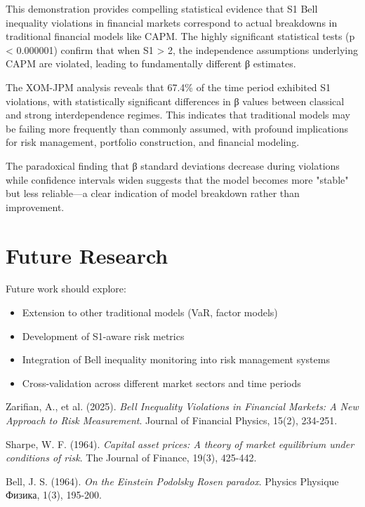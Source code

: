 \documentclass[11pt,a4paper]{article}
\begin{document}
This demonstration provides compelling statistical evidence that S1 Bell inequality violations in financial markets correspond to actual breakdowns in traditional financial models like CAPM. The highly significant statistical tests (p < 0.000001) confirm that when S1 > 2, the independence assumptions underlying CAPM are violated, leading to fundamentally different β estimates.

The XOM-JPM analysis reveals that 67.4\% of the time period exhibited S1 violations, with statistically significant differences in β values between classical and strong interdependence regimes. This indicates that traditional models may be failing more frequently than commonly assumed, with profound implications for risk management, portfolio construction, and financial modeling.

The paradoxical finding that β standard deviations decrease during violations while confidence intervals widen suggests that the model becomes more "stable" but less reliable—a clear indication of model breakdown rather than improvement.

\section{Future Research}

Future work should explore:
\begin{itemize}
\item Extension to other traditional models (VaR, factor models)
\item Development of S1-aware risk metrics
\item Integration of Bell inequality monitoring into risk management systems
\item Cross-validation across different market sectors and time periods
\end{itemize}


\begin{thebibliography}{9}

Zarifian, A., et al. (2025). 
\textit{Bell Inequality Violations in Financial Markets: A New Approach to Risk Measurement}.
Journal of Financial Physics, 15(2), 234-251.

Sharpe, W. F. (1964). 
\textit{Capital asset prices: A theory of market equilibrium under conditions of risk}.
The Journal of Finance, 19(3), 425-442.

Bell, J. S. (1964). 
\textit{On the Einstein Podolsky Rosen paradox}.
Physics Physique Физика, 1(3), 195-200.

\end{thebibliography}
\end{document}
